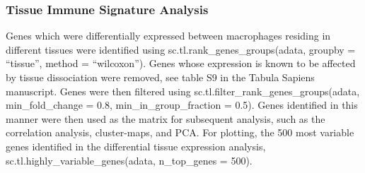 \subsubsection{Tissue Immune Signature Analysis}
Genes which were differentially expressed between macrophages residing in different tissues
were identified using sc.tl.rank\_genes\_groups(adata, groupby = ``tissue”, method = ``wilcoxon”).
Genes whose expression is known to be affected by tissue dissociation were removed, see table S9 in the Tabula Sapiens manuscript\cite{tabula_sapiens_consortium_tabula_2022}. Genes were then filtered using sc.tl.filter\_rank\_genes\_groups(adata, min\_fold\_change = 0.8, min\_in\_group\_fraction = 0.5). Genes identified in this manner were then
used as the matrix for subsequent analysis, such as the correlation analysis, cluster-maps, and
PCA. For plotting, the 500 most variable genes identified in the differential tissue expression
analysis, sc.tl.highly\_variable\_genes(adata, n\_top\_genes = 500).